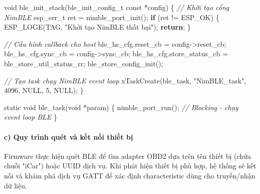 \documentclass[13pt,a4paper]{extarticle}
\newenvironment{Shaded}{}{}
\newcommand{\CommentTok}[1]{\textcolor[rgb]{0.38,0.63,0.69}{\textit{#1}}}
\newcommand{\ControlFlowTok}[1]{\textcolor[rgb]{0.00,0.44,0.13}{\textbf{#1}}}
\newcommand{\DataTypeTok}[1]{\textcolor[rgb]{0.56,0.13,0.00}{#1}}
\newcommand{\DecValTok}[1]{\textcolor[rgb]{0.25,0.63,0.44}{#1}}
\newcommand{\NormalTok}[1]{#1}
\newcommand{\OperatorTok}[1]{\textcolor[rgb]{0.40,0.40,0.40}{#1}}
\newcommand{\StringTok}[1]{\textcolor[rgb]{0.25,0.44,0.63}{#1}}
\renewcommand{\\}{\thesislongtableorignewline\hline}%
\begin{document}
\begin{Shaded}
\begin{Highlighting}[]
\DataTypeTok{void}\NormalTok{ ble\_init\_stack}\OperatorTok{(}\NormalTok{ble\_init\_config\_t }\DataTypeTok{const} \OperatorTok{*}\NormalTok{config}\OperatorTok{)}
\OperatorTok{\{}
    \CommentTok{// Khởi tạo cổng NimBLE}
\NormalTok{    esp\_err\_t ret }\OperatorTok{=}\NormalTok{ nimble\_port\_init}\OperatorTok{();}
    \ControlFlowTok{if} \OperatorTok{(}\NormalTok{ret }\OperatorTok{!=}\NormalTok{ ESP\_OK}\OperatorTok{)} \OperatorTok{\{}
\NormalTok{        ESP\_LOGE}\OperatorTok{(}\NormalTok{TAG}\OperatorTok{,} \StringTok{"Khởi tạo NimBLE thất bại"}\OperatorTok{);}
        \ControlFlowTok{return}\OperatorTok{;}
    \OperatorTok{\}}

    \CommentTok{// Cấu hình callback cho host}
\NormalTok{    ble\_hs\_cfg}\OperatorTok{.}\NormalTok{reset\_cb        }\OperatorTok{=}\NormalTok{ config}\OperatorTok{{-}\textgreater{}}\NormalTok{reset\_cb}\OperatorTok{;}
\NormalTok{    ble\_hs\_cfg}\OperatorTok{.}\NormalTok{sync\_cb         }\OperatorTok{=}\NormalTok{ config}\OperatorTok{{-}\textgreater{}}\NormalTok{sync\_cb}\OperatorTok{;}
\NormalTok{    ble\_hs\_cfg}\OperatorTok{.}\NormalTok{store\_status\_cb }\OperatorTok{=}\NormalTok{ ble\_store\_util\_status\_rr}\OperatorTok{;}
\NormalTok{    ble\_store\_config\_init}\OperatorTok{();}

    \CommentTok{// Tạo task chạy NimBLE event loop}
\NormalTok{    xTaskCreate}\OperatorTok{(}\NormalTok{ble\_task}\OperatorTok{,} \StringTok{"NimBLE\_task"}\OperatorTok{,} \DecValTok{4096}\OperatorTok{,}\NormalTok{ NULL}\OperatorTok{,} \DecValTok{5}\OperatorTok{,}\NormalTok{ NULL}\OperatorTok{);}
\OperatorTok{\}}

\DataTypeTok{static} \DataTypeTok{void}\NormalTok{ ble\_task}\OperatorTok{(}\DataTypeTok{void} \OperatorTok{*}\NormalTok{param}\OperatorTok{)}
\OperatorTok{\{}
\NormalTok{    nimble\_port\_run}\OperatorTok{();}  \CommentTok{// Blocking {-} chạy event loop BLE}
\OperatorTok{\}}
\end{Highlighting}
\end{Shaded}

\paragraph{c) Quy trình quét và kết nối thiết
bị}\label{c-quy-truxecnh-quuxe9t-vuxe0-kux1ebft-nux1ed1i-thiux1ebft-bux1ecb}

Firmware thực hiện quét BLE để tìm adapter OBD2 dựa trên tên thiết bị
(chứa chuỗi "iCar") hoặc UUID dịch vụ. Khi phát hiện thiết bị phù hợp,
hệ thống sẽ kết nối và khám phá dịch vụ GATT để xác định characteristic
dùng cho truyền/nhận dữ liệu.
\end{document}
